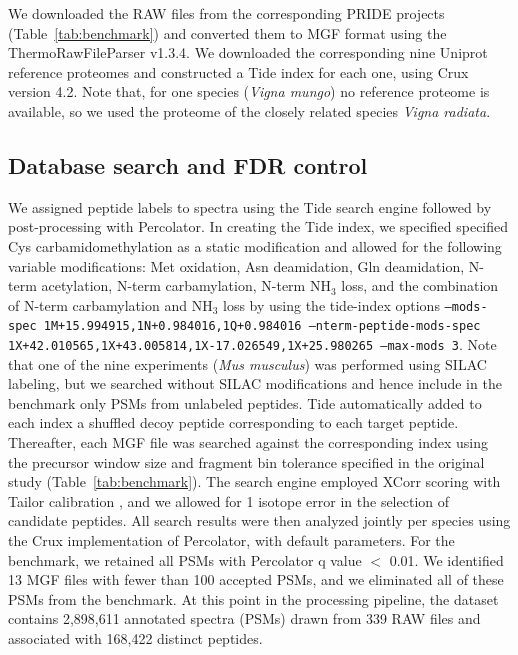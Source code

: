 \documentclass{article}
\begin{document}

We downloaded the RAW files from the corresponding PRIDE projects (Table~\ref{tab:benchmark}) and converted them to MGF format using the ThermoRawFileParser v1.3.4.
We downloaded the corresponding nine Uniprot reference proteomes and constructed a Tide index for each one, using Crux version 4.2.
Note that, for one species (\textit{Vigna mungo}) no reference proteome is available, so we used the proteome of the closely related species \textit{Vigna radiata}.

\subsection*{Database search and FDR control}

\begin{sloppypar}
We assigned peptide labels to spectra using the Tide search engine followed by post-processing with Percolator.
In creating the Tide index, we specified specified Cys carbamidomethylation as a static modification and allowed for the following variable modifications: Met oxidation, Asn deamidation, Gln deamidation, N-term acetylation, N-term carbamylation, N-term NH$_{3}$ loss, and the combination of N-term carbamylation and NH$_{3}$ loss by using the tide-index options {\tt --mods-spec 1M+15.994915,\allowbreak 1N+0.984016,\allowbreak 1Q+0.984016 --nterm-peptide-mods-spec 1X+42.010565,\allowbreak 1X+43.005814,\allowbreak 1X-17.026549,\allowbreak 1X+25.980265 --max-mods 3}.
Note that one of the nine experiments (\textit{Mus musculus}) was performed using SILAC labeling, but we searched without SILAC modifications and hence include in the benchmark only PSMs from unlabeled peptides.
Tide automatically added to each index a shuffled decoy peptide corresponding to each target peptide.
Thereafter, each MGF file was searched against the corresponding index using the precursor window size and fragment bin tolerance specified in the original study (Table~\ref{tab:benchmark}).
The search engine employed XCorr scoring with Tailor calibration \cite{sulimov2020tailor}, and we allowed for 1 isotope error in the selection of candidate peptides.
All search results were then analyzed jointly per species using the Crux implementation of Percolator, with default parameters.
For the benchmark, we retained all PSMs with Percolator q value $<$ 0.01.
We identified 13 MGF files with fewer than 100 accepted PSMs, and we eliminated all of these PSMs from the benchmark.
At this point in the processing pipeline, the dataset contains 2,898,611 annotated spectra (PSMs)  drawn from 339 RAW files and associated with 168,422 distinct peptides.
\end{sloppypar}
\end{document}
